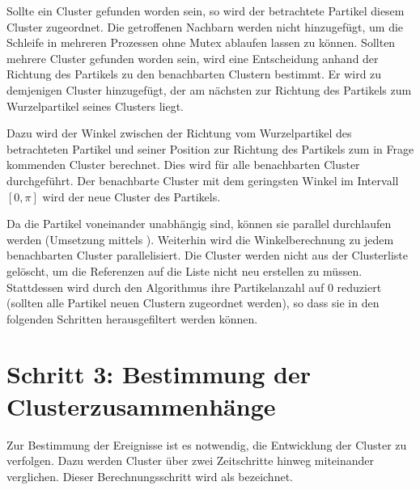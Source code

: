 Sollte ein Cluster gefunden worden sein, so wird der betrachtete Partikel diesem Cluster zugeordnet. Die getroffenen Nachbarn werden nicht hinzugefügt, um die Schleife in mehreren Prozessen ohne Mutex ablaufen lassen zu können. Sollten mehrere Cluster gefunden worden sein, wird eine Entscheidung anhand der Richtung des Partikels zu den benachbarten Clustern bestimmt. Er wird zu demjenigen Cluster hinzugefügt, der am nächsten zur Richtung des Partikels zum Wurzelpartikel seines Clusters liegt.

Dazu wird der Winkel zwischen der Richtung vom Wurzelpartikel des betrachteten Partikel und seiner Position zur Richtung des Partikels zum in Frage kommenden Cluster berechnet. Dies wird für alle benachbarten Cluster durchgeführt. Der benachbarte Cluster mit dem geringsten Winkel im Intervall $[0, \pi]$ wird der neue Cluster des Partikels.

Da die Partikel voneinander unabhängig sind, können sie parallel durchlaufen werden (Umsetzung mittels ). Weiterhin wird die Winkelberechnung zu jedem benachbarten Cluster parallelisiert.
Die Cluster werden nicht aus der Clusterliste gelöscht, um die Referenzen auf die Liste nicht neu erstellen zu müssen. Stattdessen wird durch den Algorithmus ihre Partikelanzahl auf 0 reduziert (sollten alle Partikel neuen Clustern zugeordnet werden), so dass sie in den folgenden Schritten herausgefiltert werden können.

\section{Schritt 3: Bestimmung der Clusterzusammenhänge}\label{sec:clusterzusammenhaenge}
Zur Bestimmung der Ereignisse ist es notwendig, die Entwicklung der Cluster zu verfolgen. Dazu werden Cluster über zwei Zeitschritte hinweg miteinander verglichen. Dieser Berechnungsschritt wird als \SECC bezeichnet.


